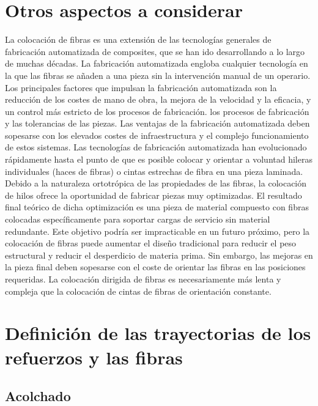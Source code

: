 \begin{enumerate}[label=\arabic*.]
\section{Otros aspectos a considerar}
La colocación de fibras es una extensión de las tecnologías generales de fabricación automatizada de composites, que se han ido desarrollando a lo largo de muchas décadas. La fabricación automatizada engloba cualquier tecnología en la que las fibras se añaden a una pieza sin la intervención manual de un operario. Los principales factores que impulsan la fabricación automatizada son la reducción de los costes de mano de obra, la mejora de la velocidad y la eficacia, y un control más estricto de los procesos de fabricación.
los procesos de fabricación y las tolerancias de las piezas. Las ventajas de la fabricación automatizada deben sopesarse con los elevados costes de infraestructura y el complejo funcionamiento de estos sistemas.
Las tecnologías de fabricación automatizada han evolucionado rápidamente hasta el punto de que es posible colocar y orientar a voluntad hileras individuales (haces de fibras) o cintas estrechas de fibra en una pieza laminada. Debido a la naturaleza ortotrópica de las propiedades de las fibras, la colocación de hilos ofrece la oportunidad de fabricar piezas muy optimizadas. El resultado final teórico de dicha optimización es una pieza de material compuesto con fibras colocadas específicamente para soportar cargas de servicio sin material redundante. Este objetivo podría ser impracticable en un futuro próximo, pero la colocación de fibras puede aumentar el diseño tradicional para reducir el peso estructural y reducir el desperdicio de materia prima. Sin embargo, las mejoras en la pieza final deben sopesarse con el coste de orientar las fibras en las posiciones requeridas. La colocación dirigida de fibras es necesariamente más lenta y compleja que la colocación de cintas de fibras de orientación constante.


\section{Definición de las trayectorias de los refuerzos y las fibras}


\subsection{Acolchado}


\end{enumerate}

